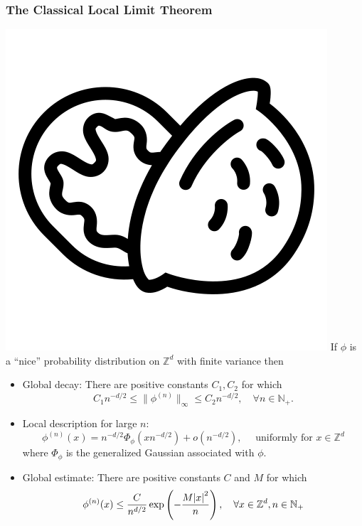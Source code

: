 \documentclass{beamer}
\theoremstyle{definition}
\newcommand{\lp}{\left(}
\newcommand{\rp}{\right)}
\begin{document}
\begin{frame}
\frametitle{The Classical Local Limit Theorem}
\includegraphics[scale=0.025]{nutshell} If $\phi$ is a ``nice'' probability distribution on $\mathbb{Z}^d$ with finite variance then 
\begin{itemize}
	\item Global decay: There are positive constants $C_1, C_2$ for which 
	\begin{equation*}
	C_1 n^{-d/2} \leq \| \phi^{(n)} \|_\infty \leq C_2n^{-d/2}, \quad \forall n\in \mathbb{N}_+.
	\end{equation*}
	
	
	\item Local description for large $n$:
	\begin{equation*}
	\phi^{(n)}(x) = n^{-d/2} \Phi_\phi \lp x n^{-d/2} \rp + o\lp n^{-d/2} \rp, \quad \text{	uniformly for } x\in \mathbb{Z}^d
	\end{equation*}
	where $\Phi_\phi$ is the generalized Gaussian associated with $\phi$. 
	
	\item Global estimate: There are positive constants $C$ and $M$ for which
	\begin{equation*}
	\phi^{(n)}(x) \leq \frac{C}{n^{d/2}} \exp \lp -\frac{M\abs{x}^2}{n} \rp, \quad \forall x\in \mathbb{Z}^d, n\in \mathbb{N}_+
	\end{equation*}
	
\end{itemize}
\end{frame}
\end{document}
